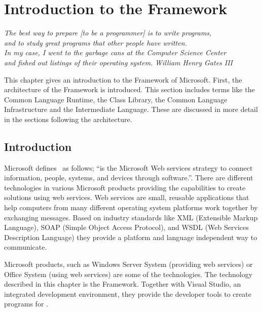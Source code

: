 \chapter{Introduction to the \dotNET Framework}
\begin{flushright}
\textit{The best way to prepare [to be a programmer] is to write programs,}\\
\textit{and to study great programs that other people have written.}\\
\textit{In my case, I went to the garbage cans at the Computer Science Center}\\
\textit{and fished out listings of their operating system.}
\textit{William Henry Gates III}\\
\end{flushright}

\label{chp:dotnet_platform}

This chapter gives an introduction to the \dotNET Framework of Microsoft. First, the architecture of the \dotNET Framework is introduced. This section includes terms like the Common Language Runtime, the \dotNET Class Library, the Common Language Infrastructure and the Intermediate Language. These are discussed in more detail in the sections following the architecture.

%
%
\section{Introduction}
Microsoft defines~\cite{Microsoft03-5} \dotNET as follows; ``\dotNET is the Microsoft Web services strategy to connect information, people, systems, and devices through software.''. There are different \dotNET technologies in various Microsoft products providing the capabilities to create solutions using web services. 
Web services are small, reusable applications that help computers from many different operating system platforms work together by exchanging messages. Based on industry standards like XML (Extensible Markup Language), SOAP (Simple Object Access Protocol), and WSDL (Web Services Description Language) they provide a platform and language independent way to communicate.

Microsoft products, such as Windows Server System (providing web services) or Office System (using web services) are some of the \dotNET technologies. The technology described in this chapter is the \dotNET Framework. Together with Visual Studio, an integrated development environment, they provide the developer tools to create programs for \dotNET. 

